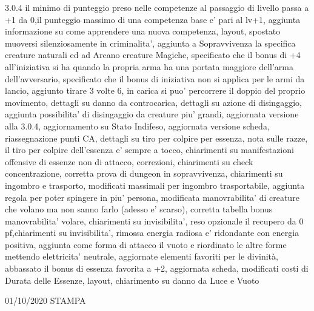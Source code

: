 \documentclass[a4paper,11pt,twoside,openany]{book}
\begin{document}
{	3.0.4 il minimo di punteggio preso nelle competenze al passaggio di livello passa a +1 da 0,il punteggio massimo di una competenza base e' pari al lv+1, aggiunta informazione su come apprendere una nuova competenza, layout, spostato muoversi silenziosamente in criminalita', aggiunta a Sopravvivenza la specifica creature naturali ed ad Arcano creature Magiche, specificato che il bonus di +4 all'iniziativa si ha quando la propria arma ha una portata maggiore dell'arma dell'avversario, specificato che il bonus di iniziativa non si applica per le armi da lancio, aggiunto tirare 3 volte 6, in carica si puo' percorrere il doppio del proprio movimento, dettagli su danno da controcarica, dettagli su azione di disingaggio, aggiunta possibilita' di disingaggio da creature piu' grandi, aggiornata versione alla 3.0.4, aggiornamento su Stato Indifeso, aggiornata versione scheda, riassegnazione punti CA, dettagli su tiro per colpire per essenza, nota sulle razze, il tiro per colpire dell'essenza e' sempre a tocco, chiarimenti su manifestazioni offensive di essenze non di attacco, correzioni, chiarimenti su check concentrazione, corretta prova di dungeon in sopravvivenza, chiarimenti su ingombro e trasporto, modificati massimali per ingombro trasportabile, aggiunta regola per poter spingere in piu' persona, modificata manovrabilita' di creature che volano ma non sanno farlo (adesso e' scarso), corretta tabella bonus manovrabilita' volare, chiarimenti su invisibilita', reso opzionale il recupero da 0 pf,chiarimenti su invisibilita', rimossa energia radiosa e' ridondante con energia positiva, aggiunta come forma di attacco il vuoto e riordinato le altre forme mettendo elettricita' neutrale, aggiornate elementi favoriti per le divinità, abbassato il bonus di essenza favorita a +2, aggiornata scheda, modificati costi di Durata delle Essenze, layout, chiarimento su danno da Luce e Vuoto

	01/10/2020 STAMPA
	
}
\end{document}
